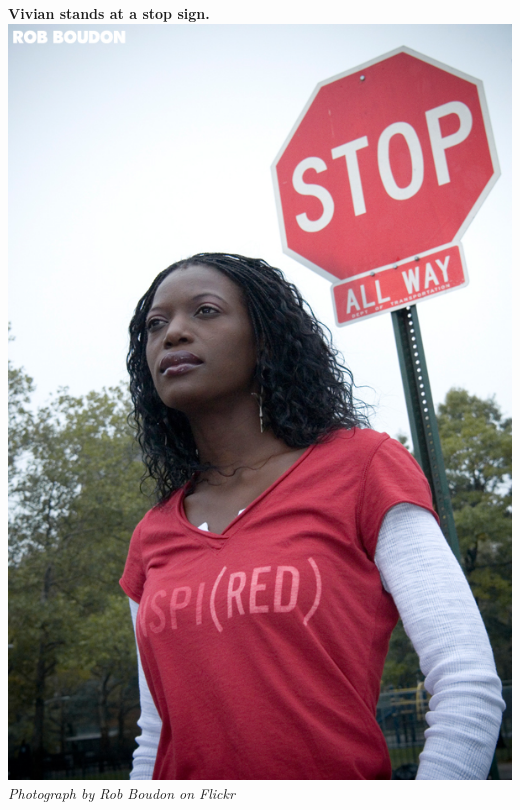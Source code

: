 \begin{minipage}{.5\textwidth}
\begin{center}
 \textbf{Vivian stands at a stop sign.}\\
\includegraphics[width=.8\textwidth]{photos/stopstreet_by_RobBoudon_Flickr.jpg}\\
\textit{Photograph by Rob Boudon on Flickr}
\end{center}
\end{minipage}

